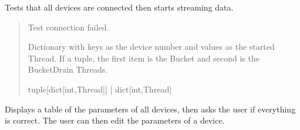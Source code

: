 \documentclass[letterpaper,10pt,english]{sphinxmanual}
\begin{document}
\begin{fulllineitems}

\begin{fulllineitems}
\label{\detokenize{Setup.SetupOneDevice:Setup.SetupOneDevice.Setup_PodInterface.SetupInterface.Stream}}
\pysigstartsignatures
{}
\pysigstopsignatures
\sphinxAtStartPar
Tests that all devices are connected then starts streaming data.
\begin{quote}\begin{description}
\sphinxAtStartPar
{} \textendash{} Test connection failed.

\sphinxAtStartPar
Dictionary with keys as the device number and                 values as the started Thread. If a tuple, the first item is the Bucket and second is the                 BucketDrain Threads.

\sphinxAtStartPar
tuple{[}dict{[}int,Thread{]}{]} | dict{[}int,Thread{]}

\end{description}\end{quote}

\end{fulllineitems}


\begin{fulllineitems}
\label{\detokenize{Setup.SetupOneDevice:Setup.SetupOneDevice.Setup_PodInterface.SetupInterface.ValidateParams}}
\pysigstartsignatures
{}
\pysigstopsignatures
\sphinxAtStartPar
Displays a table of the parameters of all devices, then asks the user if everything         is correct. The user can then edit the parameters of a device.

\end{fulllineitems}


\end{fulllineitems}
\end{document}
